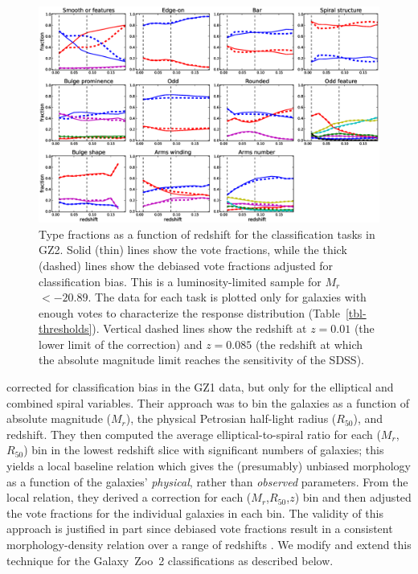 \documentclass[useAMS,usenatbib]{mn2e}
\newcommand{\mr}{$M_r$}
\newcommand{\rfifty}{$R_{50}$}
\begin{document}
\begin{figure}
\includegraphics[angle=0,width=7.0in]{figures/gz2_type_fractions.eps}
\caption{Type fractions as a function of redshift for the classification tasks in GZ2. Solid (thin) lines show the vote fractions, while the thick (dashed) lines show the debiased vote fractions adjusted for classification bias. This is a luminosity-limited sample for \mr~$<-20.89$. The data for each task is plotted only for galaxies with enough votes to characterize the response distribution (Table~\ref{tbl-thresholds}). Vertical dashed lines show the redshift at $z=0.01$ (the lower limit of the correction) and $z=0.085$ (the redshift at which the absolute magnitude limit reaches the sensitivity of the SDSS). 
\label{fig-type_fractions}}
\end{figure}

\citet{bam09} corrected for classification bias in the GZ1 data, but only for the elliptical and combined spiral variables. Their approach was to bin the galaxies as a function of absolute magnitude (\mr), the physical Petrosian half-light radius (\rfifty), and redshift. They then computed the average elliptical-to-spiral ratio for each (\mr,\rfifty) bin in the lowest redshift slice with significant numbers of galaxies; this yields a local baseline relation which gives the (presumably) unbiased morphology as a function of the galaxies' {\em physical}, rather than {\em observed} parameters. From the local relation, they derived a correction for each (\mr,\rfifty,$z$) bin and then adjusted the vote fractions for the individual galaxies in each bin. The validity of this approach is justified in part since debiased vote fractions result in a consistent morphology-density relation over a range of redshifts \citep{bam09}. We modify and extend this technique for the Galaxy~Zoo~2 classifications as described below. 
\end{document}
